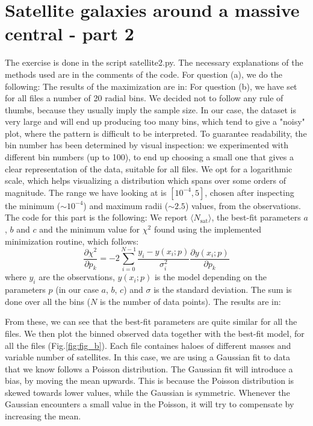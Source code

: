 \section{Satellite galaxies around a massive central - part 2}
The exercise is done in the script satellite2.py. The necessary explanations of the methods used are in the comments of the code. 
For question (a), we do the following:  
The results of the maximization are in: 
For question (b), we have set for all files a number of 20 radial bins. We decided not to follow any rule of thumbs, because they usually imply the sample size. 
In our case, the dataset is very large and will end up producing too many bins, which tend to give a "noisy" plot, where the pattern is difficult to be interpreted.
To guarantee readability, the bin number has been determined by visual inspection: we experimented with different bin numbers (up to 100), to end up choosing a small one
that gives a clear representation of the data, suitable for all files. We opt for a logarithmic scale, which helps visualizing a distribution which spans over some orders 
of magnitude. The range we have looking at is $[10^{-4}, 5]$, chosen after inspecting the minimum ($\sim 10^{-4}$) and maximum radii ($\sim 2.5$) values, from the observations.
The code for this part is the following:  
We report $\langle N_\text{sat} \rangle$, the best-fit parameters $a$, $b$ and $c$ and the minimum value for $\chi^2$ found using the implemented minimization routine, which follows:
\[ \frac{\partial \chi^2}{\partial p_k} = -2 \sum_{i=0}^{N-1} \frac{y_i - y(x_i; p)}{\sigma_i^2} \frac{\partial y(x_i; p)}{\partial p_k} \]
where $y_i$ are the observations, $y(x_i; p)$ is the model depending on the parameters $p$ (in our case $a$, $b$, $c$) and $\sigma$ is the standard deviation. The sum is done 
over all the bins ($N$ is the number of data points).
The results are in:

From these, we can see that the best-fit parameters are quite similar for all the files.
We then plot the binned observed data together with the best-fit model, for all the files (Fig.\ref{fig:fig_b}). Each file containes haloes of different masses and variable number
of satellites. In this case, we are using a Gaussian fit to data that we know follows a Poisson distribution. The Gaussian fit will introduce a bias,
by moving the mean upwards. This is because the Poisson distribution is skewed towards lower values, while the Gaussian is symmetric. Whenever the Gaussian encounters
a small value in the Poisson, it will try to compensate by increasing the mean. 

